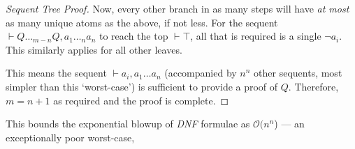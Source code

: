\begin{proof}[Sequent Tree Proof]
        Now, every other branch in as many steps will have \textit{at most} as many unique atoms as the above, if not less.
        For the sequent $\vdash Q \ldots_{m-n} Q, a_1 \ldots_n a_n$ to reach the top $\vdash \top$, all that is required is a single $\neg a_i$.
        This similarly applies for all other leaves.

        This means the sequent $\vdash a_i, a_1 \ldots a_n$ (accompanied by $n^n$ other sequents, most simpler than this `worst-case') is sufficient to provide a proof of $Q$.
        Therefore, $m = n + 1$ as required and the proof is complete.
    \end{proof}

    \begin{remark*}
        This bounds the exponential blowup of \textit{DNF} formulae as $\mathcal{O}(n^n$) --- an exceptionally poor worst-case,
    \end{remark*}

